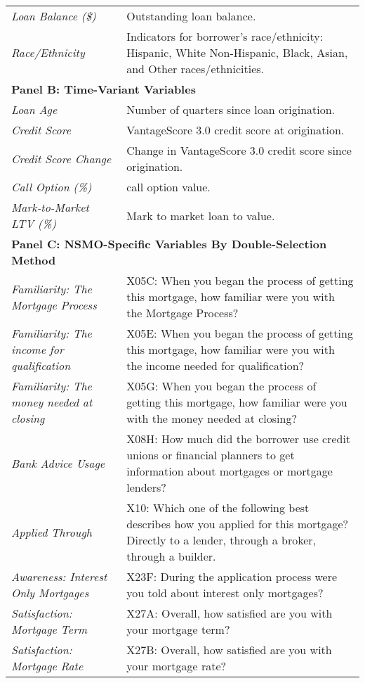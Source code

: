 \documentclass[11pt]{article}
\begin{document}
{\begin{table}[!h]
{\begin{tabular}{lp{11cm}}
\textit{Loan Balance (\$)} & Outstanding loan balance. \\
\textit{Race/Ethnicity} & Indicators for borrower’s race/ethnicity: Hispanic, White Non-Hispanic, Black, Asian, and Other races/ethnicities. \\
\midrule
\multicolumn{2}{l}{\textbf{Panel B: Time-Variant Variables}} \\
\midrule
\textit{Loan Age} & Number of quarters since loan origination. \\
\textit{Credit Score} & VantageScore 3.0 credit score at origination. \\
\textit{Credit Score Change} & Change in VantageScore 3.0 credit score since origination. \\
\textit{Call Option (\%)} & \citet{deng2000mortgage} call option value. \\
\textit{Mark-to-Market LTV (\%)} & Mark to market loan to value. \\
\midrule
\multicolumn{2}{l}{\textbf{Panel C: NSMO-Specific Variables By Double-Selection Method}} \\
\midrule
\textit{Familiarity: The Mortgage Process} & X05C: When you began the process of getting this mortgage, how familiar were you with the Mortgage Process? \\
\textit{Familiarity: The income for qualification} & X05E: When you began the process of getting this mortgage, how familiar were you with the income needed for qualification?  \\
\textit{Familiarity: The money needed at closing} & X05G: When you began the process of getting this mortgage, how familiar were you with the money needed at closing?  \\
\textit{Bank Advice Usage} & X08H: How much did the borrower use credit unions or financial planners to get information about mortgages or mortgage lenders? \\
\textit{Applied Through} & X10: Which one of the following best describes how you applied for this mortgage? Directly to a lender, through a broker, through a builder. \\
\textit{Awareness: Interest Only Mortgages} & X23F: During the application process were you told about interest only mortgages? \\
\textit{Satisfaction: Mortgage Term} & X27A: Overall, how satisfied are you with your mortgage term? \\
\textit{Satisfaction: Mortgage Rate} & X27B: Overall, how satisfied are you with your mortgage rate? \\

\end{tabular}}
\end{table}}
\end{document}
